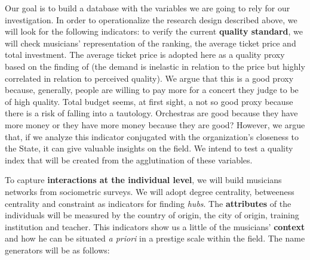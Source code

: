 \documentclass[a4paper, 12pt, openright, oneside, german, french, brazil, english]{abntex2}
\begin{document}
	Our goal is to build a database with the variables we are going to rely for our investigation. In order to operationalize the research design described above, we will look for the following indicators: to verify the current \textbf{quality standard}, we will check musicians' representation of the ranking, the average ticket price and total investment. The average ticket price is adopted here as a quality proxy based on the finding of  (the demand is inelastic in relation to the price but highly correlated in relation to perceived quality). We argue that this is a good proxy because, generally, people are willing to pay more for a concert they judge to be of high quality. Total budget seems, at first sight, a not so good proxy because there is a risk of falling into a tautology. Orchestras are good because they have more money or they have more money because they are good? However, we argue that, if we analyze this indicator conjugated with the organization's closeness to the State, it can give valuable insights on the field. We intend to test a quality index that will be created from the agglutination of these variables.
	
	
	To capture \textbf{interactions at the individual level}, we will build musicians networks from sociometric surveys. We will adopt degree centrality, betweeness centrality and constraint as indicators for finding \textit{hubs}. The \textbf{attributes} of the individuals will be measured by the country of origin, the city of origin, training institution and teacher. This indicators show us a little of the musicians' \textbf{context} and how he can be situated \textit{a priori} in a prestige scale within the field. The name generators will be as follows:
\end{document}
